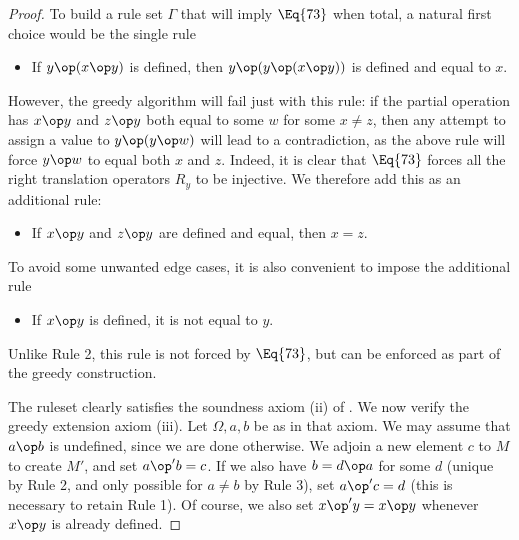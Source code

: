 \begin{proof} To build a rule set $\Gamma$ that will imply $\Eq{73}$ when total, a natural first choice would be the single rule
\begin{itemize}
\item[1.] If $y \op (x \op y)$ is defined, then $y \op (y \op (x \op y))$ is defined and equal to $x$.
\end{itemize}
However, the greedy algorithm will fail just with this rule: if the partial operation has $x \op y$ and $z \op y$ both equal to some $w$ for some $x \neq z$, then any attempt to assign a value to $y \op (y \op w)$ will lead to a contradiction, as the above rule will force $y \op w$ to equal both $x$ and $z$.  Indeed, it is clear that $\Eq{73}$ forces all the right translation operators $R_y$ to be injective.  We therefore add this as an additional rule:
\begin{itemize}
\item[2.] If $x \op y$ and $z \op y$ are defined and equal, then $x=z$.
\end{itemize}
To avoid some unwanted edge cases, it is also convenient to impose the additional rule
\begin{itemize}
  \item[3.] If $x \op y$ is defined, it is not equal to $y$.
\end{itemize}
Unlike Rule 2, this rule is not forced by $\Eq{73}$, but can be enforced as part of the greedy construction.

The ruleset clearly satisfies the soundness axiom (ii) of .  We now verify the greedy extension axiom (iii).  Let $\Omega,a,b$ be as in that axiom. We may assume that $a \op b$ is undefined, since we are done otherwise. We adjoin a new element $c$ to $M$ to create $M'$, and set $a \op' b = c$.  If we also have $b = d \op a$ for some $d$ (unique by Rule 2, and only possible for $a \neq b$ by Rule 3), set $a \op' c = d$ (this is necessary to retain Rule 1).  Of course, we also set $x \op' y = x \op y$ whenever $x \op y$ is already defined.


\end{proof}
